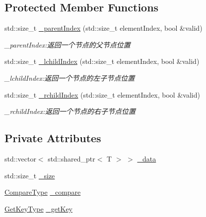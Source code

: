 \subsection*{Protected Member Functions}
\begin{DoxyCompactItemize}
\item 
std\+::size\+\_\+t \hyperlink{class_introduction_to_algorithm_1_1_queue_algorithm_1_1_min_queue_a3b7cac401c8cf45806e61aad3799eda0}{\+\_\+parent\+Index} (std\+::size\+\_\+t element\+Index, bool \&valid)
\begin{DoxyCompactList}\small\item\em \+\_\+parent\+Index\+:返回一个节点的父节点位置 \end{DoxyCompactList}\item 
std\+::size\+\_\+t \hyperlink{class_introduction_to_algorithm_1_1_queue_algorithm_1_1_min_queue_a0d2a517cd63fc33c0403a4d4c83c7e9d}{\+\_\+lchild\+Index} (std\+::size\+\_\+t element\+Index, bool \&valid)
\begin{DoxyCompactList}\small\item\em \+\_\+lchild\+Index\+:返回一个节点的左子节点位置 \end{DoxyCompactList}\item 
std\+::size\+\_\+t \hyperlink{class_introduction_to_algorithm_1_1_queue_algorithm_1_1_min_queue_a7129becd0fd74b5d2c17702e65f32300}{\+\_\+rchild\+Index} (std\+::size\+\_\+t element\+Index, bool \&valid)
\begin{DoxyCompactList}\small\item\em \+\_\+rchild\+Index\+:返回一个节点的右子节点位置 \end{DoxyCompactList}\end{DoxyCompactItemize}
\subsection*{Private Attributes}
\begin{DoxyCompactItemize}
\item 
std\+::vector$<$ std\+::shared\+\_\+ptr$<$ T $>$ $>$ \hyperlink{class_introduction_to_algorithm_1_1_queue_algorithm_1_1_min_queue_ad463395cef741624e6d078e4e4fc624f}{\+\_\+data}
\item 
std\+::size\+\_\+t \hyperlink{class_introduction_to_algorithm_1_1_queue_algorithm_1_1_min_queue_a0de92802e37516dda2c01de776aba641}{\+\_\+size}
\item 
\hyperlink{class_introduction_to_algorithm_1_1_queue_algorithm_1_1_min_queue_a8f2f5b5d2b7097bbc6edda7b9c9228a6}{Compare\+Type} \hyperlink{class_introduction_to_algorithm_1_1_queue_algorithm_1_1_min_queue_a5de60762d317fc92c18e882dd50f8dfa}{\+\_\+compare}
\item 
\hyperlink{class_introduction_to_algorithm_1_1_queue_algorithm_1_1_min_queue_a391cb754ab172d1d4cdefd34130b917c}{Get\+Key\+Type} \hyperlink{class_introduction_to_algorithm_1_1_queue_algorithm_1_1_min_queue_a3f791f9dd9d61dc2caf1d6b2b354f4c4}{\+\_\+get\+Key}
\end{DoxyCompactItemize}


